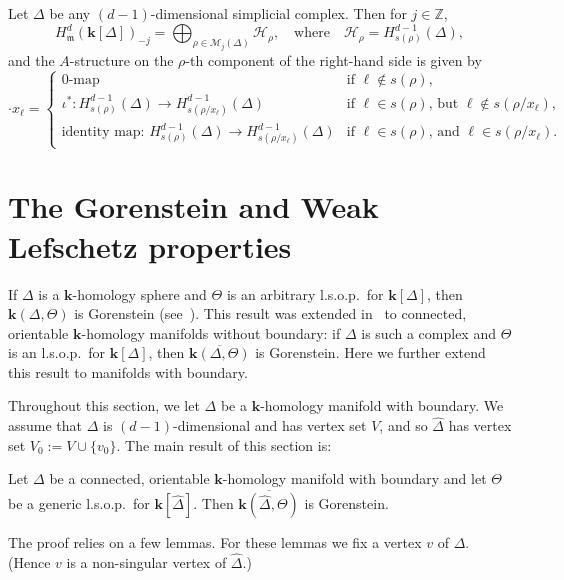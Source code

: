 \documentclass[ALCO,ThmDefs,Unicode,epreuves]{cedram}
\newcommand{\complet}[1]{\hat{#1}}
\newcommand{\field}{\mathbf{k}}
\newcommand{\ZZ}{{\mathbb Z}}
\newcommand{\M}{{\mathcal M}}
\newcommand{\HH}{{\mathcal H}}
\newcommand{\mideal}{\ensuremath{\mathfrak{m}}}
\begin{document}
\begin{theorem}[Gr{\"a}be] \label{Grabe-d}
Let $\Delta$ be any $(d-1)$-dimensional simplicial complex. Then for $j\in\ZZ$, 
\[ H^d_{\mideal}(\field[\Delta])_{-j}=\bigoplus_{\rho\in\M_j(\Delta)} \HH_{\rho}, \quad \mbox{where} \quad \HH_{\rho}=H^{d-1}_{s(\rho)}(\Delta),\]
and the $A$-structure on the $\rho$-th component of the right-hand side is given by
\[
\cdot x_\ell = \begin{cases} 
\mbox{$0$-map} & \mbox{if $\ell\notin s(\rho)$},\\
\iota^*: H^{d-1}_{s(\rho)}(\Delta) \to H^{d-1}_{s(\rho/x_\ell)}(\Delta) & \mbox{if $\ell\in s(\rho)$, but $\ell\notin s(\rho/x_\ell)$},\\
\mbox{identity map: $H^{d-1}_{s(\rho)}(\Delta) \to H^{d-1}_{s(\rho/x_\ell)}(\Delta)$} & \mbox{if $\ell\in s(\rho)$, and $\ell\in s(\rho/x_\ell)$}.
\end{cases}
\]
\end{theorem}

\section{The Gorenstein and Weak Lefschetz properties} \label{sec:Gorenstein}
If $\Delta$ is a $\field$-homology sphere and $\Theta$ is an arbitrary l.s.o.p.~for $\field[\Delta]$, then $\field(\Delta,\Theta)$ is Gorenstein (see~\cite[Theorem~II.5.1]{Stanley-96}). This result was extended in~\cite[Theorem~1.4]{Novik-Swartz-09:Gorenstein} to connected, orientable $\field$-homology manifolds without boundary: if $\Delta$ is such a complex and $\Theta$ is an l.s.o.p.~for $\field[\Delta]$, then $\overline{\field(\Delta,\Theta)}$ is Gorenstein. Here we further extend this result to manifolds with boundary. 

Throughout this section, we let $\Delta$ be a $\field$-homology manifold with boundary. We assume that $\Delta$ is $(d-1)$-dimensional and has vertex set $V$, and so $\complet{\Delta}$ has vertex set $V_0:=V\cup\{v_0\}$. The main result of this section is:

\begin{theorem} \label{thm-Gorenstein}
Let $\Delta$ be a connected, orientable $\field$-homology manifold with boundary and let $\Theta$ be a generic l.s.o.p.~for $\field[\complet{\Delta}]$. Then $\overline{\field(\complet{\Delta},\Theta)}$ is Gorenstein.
\end{theorem}

The proof relies on a few lemmas. For these lemmas we fix a vertex $v$ of $\Delta$. (Hence $v$ is a non-singular vertex of $\complet{\Delta}$.)
\end{document}
